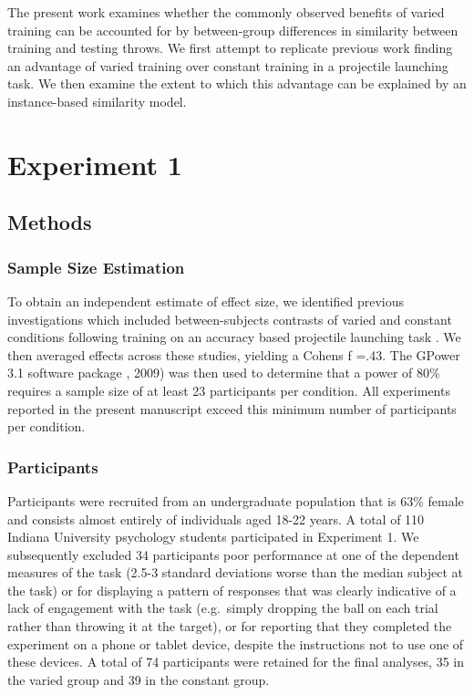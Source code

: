 \documentclass[
  12pt,
  letterpaper,
]{article}
\begin{document}
The present work examines whether the commonly observed benefits of
varied training can be accounted for by between-group differences in
similarity between training and testing throws. We first attempt to
replicate previous work finding an advantage of varied training over
constant training in a projectile launching task. We then examine the
extent to which this advantage can be explained by an instance-based
similarity model.

\section{Experiment 1}\label{experiment-1}

\subsection{Methods}\label{methods}

\subsubsection{Sample Size Estimation}\label{sample-size-estimation}

To obtain an independent estimate of effect size, we identified previous
investigations which included between-subjects contrasts of varied and
constant conditions following training on an accuracy based projectile
launching task
\autocite{chuaPracticeVariabilityPromotes2019,goodwinEffectDifferentQuantities1998,kerrSpecificVariedPractice1978,wulfEffectTypePractice1991}.
We then averaged effects across these studies, yielding a Cohens f =.43.
The GPower 3.1 software package
\autocite{faulStatisticalPowerAnalyses2009}, 2009) was then used to
determine that a power of 80\% requires a sample size of at least 23
participants per condition. All experiments reported in the present
manuscript exceed this minimum number of participants per condition.

\subsubsection{Participants}\label{participants}

Participants were recruited from an undergraduate population that is
63\% female and consists almost entirely of individuals aged 18-22
years. A total of 110 Indiana University psychology students
participated in Experiment 1. We subsequently excluded 34 participants
poor performance at one of the dependent measures of the task (2.5-3
standard deviations worse than the median subject at the task) or for
displaying a pattern of responses that was clearly indicative of a lack
of engagement with the task (e.g.~simply dropping the ball on each trial
rather than throwing it at the target), or for reporting that they
completed the experiment on a phone or tablet device, despite the
instructions not to use one of these devices. A total of 74 participants
were retained for the final analyses, 35 in the varied group and 39 in
the constant group.
\end{document}

